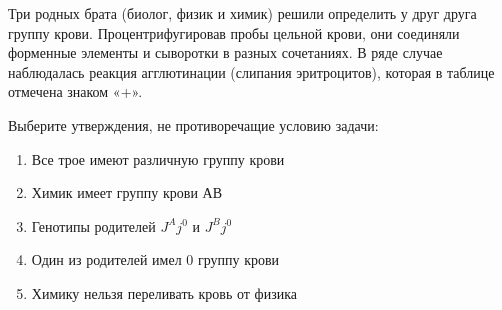 
Три родных
брата (биолог, физик и химик) решили определить у друг друга группу крови.
Процентрифугировав пробы цельной крови, они соединяли форменные элементы и
сыворотки в разных сочетаниях. В ряде случае наблюдалась реакция агглютинации (слипания
эритроцитов), которая в таблице отмечена знаком «+».


Выберите утверждения, не противоречащие
условию задачи:

\begin{enumerate}
    \item Все трое имеют различную группу крови 
    \item Химик имеет группу крови АВ
    \item Генотипы родителей $J^Aj^0$ и $J^Bj^0$
    \item Один из родителей имел 0 группу крови
    \item Химику нельзя переливать кровь от физика
\end{enumerate}

\explanationSection

